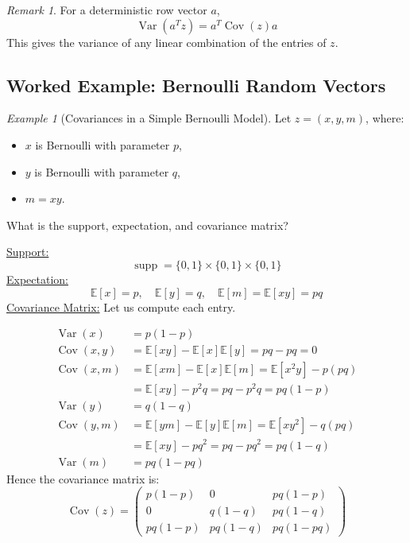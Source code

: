 \documentclass[11pt,a4paper]{article}
\theoremstyle{definition}
\theoremstyle{plain}
\theoremstyle{remark}
\newtheorem{remark}[definition]{Remark}
\newtheorem{example}[definition]{Example}
\begin{document}
\begin{remark}
For a deterministic row vector $a$,
\[
\operatorname{Var}(a^T z) = a^T \operatorname{Cov}(z) a
\]
This gives the variance of any linear combination of the entries of $z$.
\end{remark}

\subsection{Worked Example: Bernoulli Random Vectors}

\begin{example}[Covariances in a Simple Bernoulli Model]
Let $z = (x, y, m)$, where:
\begin{itemize}
    \item $x$ is Bernoulli with parameter $p$,
    \item $y$ is Bernoulli with parameter $q$,
    \item $m = x y$.
\end{itemize}
What is the support, expectation, and covariance matrix?

\underline{Support:}
\[
\operatorname{supp} = \{ 0, 1 \} \times \{ 0, 1 \} \times \{ 0, 1 \}
\]
\underline{Expectation:}
\[
\mathbb{E}[x] = p, \quad \mathbb{E}[y] = q, \quad \mathbb{E}[m] = \mathbb{E}[x y] = p q
\]
\underline{Covariance Matrix:} Let us compute each entry.

\begin{align*}
\operatorname{Var}(x) &= p(1-p) \\
\operatorname{Cov}(x, y) &= \mathbb{E}[xy] - \mathbb{E}[x]\mathbb{E}[y] = p q - p q = 0 \\
\operatorname{Cov}(x, m) &= \mathbb{E}[x m] - \mathbb{E}[x]\mathbb{E}[m] = \mathbb{E}[x^2 y] - p (p q) \\
    &= \mathbb{E}[x y] - p^2 q = p q - p^2 q = p q (1 - p) \\
\operatorname{Var}(y) &= q(1-q) \\
\operatorname{Cov}(y, m) &= \mathbb{E}[y m] - \mathbb{E}[y] \mathbb{E}[m] = \mathbb{E}[x y^2] - q (p q) \\
    &= \mathbb{E}[x y] - p q^2 = p q - p q^2 = p q (1 - q) \\
\operatorname{Var}(m) &= p q (1 - p q)
\end{align*}
Hence the covariance matrix is:
\[
\operatorname{Cov}(z) =
\begin{pmatrix}
p(1-p) & 0 & p q (1-p) \\
0 & q(1-q) & p q (1-q) \\
p q (1-p) & p q (1-q) & p q (1 - p q)
\end{pmatrix}
\]

\end{example}
\end{document}
